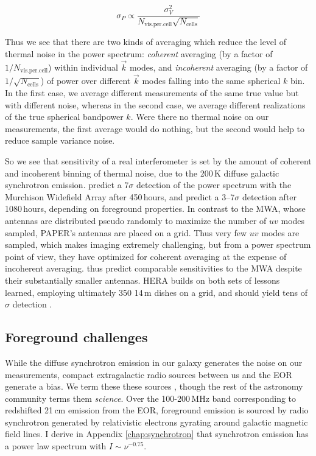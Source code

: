 \begin{equation}
	\sigma_P\propto\frac{\sigma_V^2}{N_\text{vis.per.cell}\sqrt{N_\text{cells}}}
\end{equation}

Thus we see that there are two kinds of averaging which reduce the level of thermal noise in the power spectrum: \textit{coherent} averaging (by a factor of $1/N_\text{vis.per.cell}$) within individual $\vec{k}$ modes, and \textit{incoherent} averaging (by a factor of $1/\sqrt{N_\text{cells}}$) of power over different $\vec{k}$ modes falling into the same spherical $k$ bin. In the first case, we average different measurements of the same true value but with different noise, whereas in the second case, we average different realizations of the true spherical bandpower $k$. Were there no thermal noise on our measurements, the first average would do nothing, but the second would help to reduce sample variance noise. 

So we see that sensitivity of a real interferometer is set by the amount of coherent and incoherent binning of thermal noise, due to the 200\,K diffuse galactic synchrotron emission.  \citet{beardsley13} predict a $7\sigma$ detection of the power spectrum with the Murchison Widefield Array after 450\,hours, and \citet{PoberNextGen} predict a 3--7$\sigma$ detection after 1080\,hours, depending on foreground properties. In contrast to the MWA, whose antennas are distributed pseudo randomly to maximize the number of $uv$ modes sampled, PAPER's antennas are placed on a grid. Thus very few $uv$ modes are sampled, which makes imaging extremely challenging, but from a power spectrum point of view, they have optimized for coherent averaging at the expense of incoherent averaging. \citet{PoberNextGen} thus predict comparable sensitivities to the MWA despite their substantially smaller antennas. HERA builds on both sets of lessons learned, employing ultimately 350 14\,m dishes on a grid, and should yield tens of $\sigma$ detection \citet{neben16b,ewallwice16,nithya16,PoberNextGen}. 

\subsection{Foreground challenges}

While the diffuse synchrotron emission in our galaxy generates the noise on our measurements, compact extragalactic radio sources between us and the EOR generate a bias. We term these these sources , though the rest of the astronomy community terms them \textit{science}. Over the 100-200\,MHz band corresponding to redshifted 21\,cm emission from the EOR, foreground emission is sourced by radio synchrotron generated by relativistic electrons gyrating around galactic magnetic field lines. I derive in Appendix \ref{chap:synchrotron} that synchrotron emission has a power law spectrum with $I\sim\nu^{-0.75}$.

